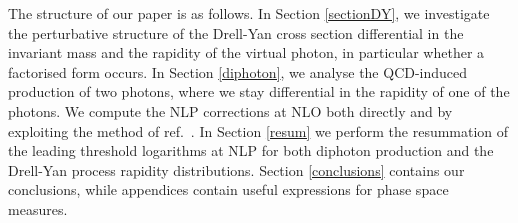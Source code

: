 \documentclass[11pt]{article}
\begin{document}
The structure of our paper is as follows. In Section \ref{sectionDY}, we investigate the perturbative structure of the Drell-Yan cross section differential in the invariant mass and the rapidity of the virtual photon, in particular whether a factorised form occurs.  In Section \ref{diphoton}, we analyse the QCD-induced production of two photons, where we stay differential in the rapidity of one of the photons. We compute the NLP corrections at NLO both directly and by exploiting the method of ref.~\cite{DelDuca:2017twk}. In Section \ref{resum} we perform the resummation of the leading threshold logarithms at NLP for both diphoton production and the Drell-Yan process rapidity distributions. Section \ref{conclusions} contains our conclusions, while appendices contain useful expressions for phase space measures.


\end{document}

